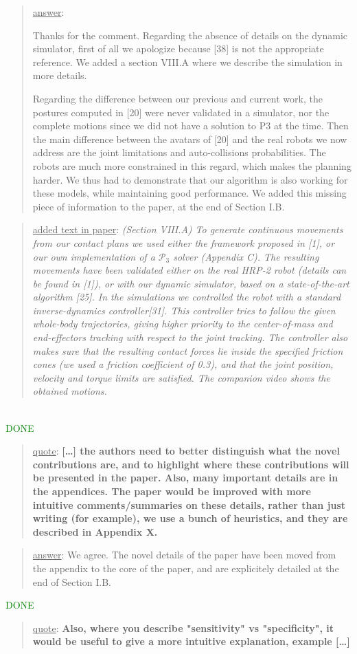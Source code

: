 \documentclass[a4paper]{article}
\newcommand{\done}[0]{\textcolor{green}{DONE}}
\newcommand\quot[1]{\begin{quote} \underline{quote}: \textbf{#1}\end{quote}}
\newcommand\as[1]{\begin{quote} \underline{answer}: {#1}\end{quote} }
\newcommand\qt[1]{\begin{quote} \underline{added text in paper}: \textit{#1}\end{quote} \leavevmode \\ }
\begin{document}
\as{Thanks for the comment. Regarding the absence of details on the dynamic simulator, first of all we apologize because [38] is not the appropriate reference.
We added a section VIII.A where we describe the simulation in more details. 

Regarding the difference between our previous and current work, the postures computed in [20] were never validated in a simulator, nor the complete motions since 
we did not have a solution to P3 at the time. Then the main
difference between the avatars of [20] and the real robots we now address are the joint limitations and auto-collisions probabilities.
The robots are much more constrained in this regard, which makes the planning harder. We thus had to demonstrate that our algorithm is also working
for these models, while maintaining good performance.
We added this missing piece of information to the paper, at the end of Section I.B.}
\qt{(Section VIII.A) To generate continuous movements from our contact plans we used either the framework proposed in [1], or our own implementation of a $\mathcal{P}_3$ solver (Appendix C).
The resulting movements have been validated either on the real HRP-2 robot (details can be found in [1]), or with our dynamic simulator, based on a state-of-the-art algorithm [25].
In the simulations we controlled the robot with a standard inverse-dynamics controller[31].
This controller tries to follow the given whole-body trajectories, giving higher priority to the center-of-mass and end-effectors tracking with respect to the joint tracking.
The controller also makes sure that the resulting contact forces lie inside the specified friction cones (we used a friction coefficient of 0.3), and that the joint position, velocity and torque limits are satisfied.
The companion video shows the obtained motions.}
\done


\quot{[\dots] the authors need to better
distinguish what the novel contributions are, and to highlight where
these contributions will be presented in the paper.  Also, many
important details are in the appendices. The paper would be improved
with more intuitive comments/summaries on these details, rather than
just writing (for example), we use a bunch of heuristics, and they are
described in Appendix X.}

\as{We agree. The novel details of the paper have been moved from the appendix to the core of the paper, and are explicitely detailed at the end of Section I.B.} \done

\quot{
Also, where you describe "sensitivity" vs "specificity", it would be
useful to give a more intuitive explanation, example [\dots]}
\end{document}
